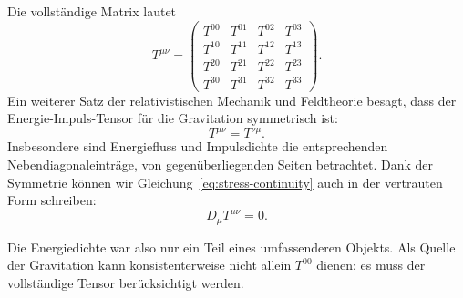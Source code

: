 Die vollständige Matrix lautet
\begin{equation}
 T^{\mu\nu}=
 \begin{pmatrix}
 T^{00}&T^{01}&T^{02}&T^{03}\\
 T^{10}&T^{11}&T^{12}&T^{13}\\
 T^{20}&T^{21}&T^{22}&T^{23}\\
 T^{30}&T^{31}&T^{32}&T^{33}
 \end{pmatrix}.
\end{equation}
Ein weiterer Satz der relativistischen Mechanik und Feldtheorie besagt, dass der Energie-Impuls-Tensor für die Gravitation symmetrisch ist:
\begin{equation}
 T^{\mu\nu}=T^{\nu\mu}.
 \label{eq:stress-symmetry}
\end{equation}
Insbesondere sind Energiefluss und Impulsdichte die entsprechenden Nebendiagonaleinträge, von gegenüberliegenden Seiten betrachtet. Dank der Symmetrie können wir Gleichung~\eqref{eq:stress-continuity} auch in der vertrauten Form schreiben:
\begin{equation}
 D_\mu T^{\mu\nu}=0.
 \label{eq:stress-conservation}
\end{equation}

\begin{classroomqa}
\end{classroomqa}

\begin{classroomqa}
\end{classroomqa}

Die Energiedichte war also nur ein Teil eines umfassenderen Objekts. Als Quelle der Gravitation kann konsistenterweise nicht allein \(T^{00}\) dienen; es muss der vollständige Tensor berücksichtigt werden.

